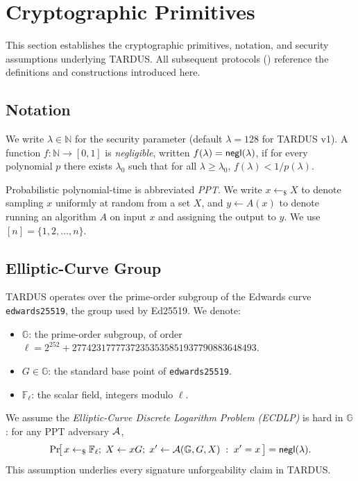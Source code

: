 \section{Cryptographic Primitives}
\label{sec:primitives}

This section establishes the cryptographic primitives, notation, and security assumptions underlying TARDUS. All subsequent protocols () reference the definitions and constructions introduced here.

\subsection{Notation}

We write $\lambda \in \mathbb{N}$ for the security parameter (default $\lambda = 128$ for TARDUS v1). A function $f \colon \mathbb{N} \to [0,1]$ is \emph{negligible}, written $f(\lambda) = \mathsf{negl}(\lambda)$, if for every polynomial $p$ there exists $\lambda_0$ such that for all $\lambda \geq \lambda_0$, $f(\lambda) < 1/p(\lambda)$.

Probabilistic polynomial-time is abbreviated \emph{PPT}. We write $x \leftarrow_\$ X$ to denote sampling $x$ uniformly at random from a set $X$, and $y \leftarrow A(x)$ to denote running an algorithm $A$ on input $x$ and assigning the output to $y$. We use $[n] = \{1, 2, \ldots, n\}$.

\subsection{Elliptic-Curve Group}
\label{sec:group}

TARDUS operates over the prime-order subgroup of the Edwards curve \texttt{edwards25519}, the group used by Ed25519. We denote:

\begin{itemize}[leftmargin=2em,itemsep=0pt]
  \item $\mathbb{G}$: the prime-order subgroup, of order $\ell = 2^{252} + 27742317777372353535851937790883648493$.
  \item $G \in \mathbb{G}$: the standard base point of \texttt{edwards25519}.
  \item $\mathbb{F}_\ell$: the scalar field, integers modulo $\ell$.
\end{itemize}

We assume the \emph{Elliptic-Curve Discrete Logarithm Problem (ECDLP)} is hard in $\mathbb{G}$: for any PPT adversary $\mathcal{A}$,
\[
  \Pr\!\bigl[\, x \leftarrow_\$ \mathbb{F}_\ell;\; X \gets xG;\; x' \leftarrow \mathcal{A}(\mathbb{G}, G, X) \;:\; x' = x \,\bigr] = \mathsf{negl}(\lambda).
\]
This assumption underlies every signature unforgeability claim in TARDUS.

